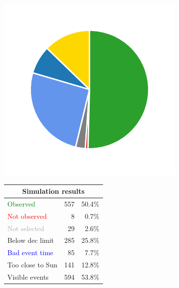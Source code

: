 \begin{colsection}
\begin{colsection}
\begin{figure}[p]
\begin{center}
    \begin{minipage}[t]{0.2\textwidth}\vspace{10pt}
    \includegraphics[width=\linewidth]{images/gw_sims/2n8_pie.png}
    \end{minipage}
    \begin{minipage}[t]{0.37\textwidth}\vspace{0pt}
    \begin{tabular}{lrr}
    \multicolumn{3}{c}{\textbf{Simulation results}} \\
    \midrule
    \textcolor{Green}{Observed} & 557 & 50.4\% \\
    \textcolor{Red}{Not observed} & 8 & 0.7\% \\
    \textcolor{darkgray}{Not selected} & 29 & 2.6\% \\
    \textcolor{NavyBlue}{Below dec limit} & 285 & 25.8\% \\
    \textcolor{Blue}{Bad event time} & 85 & 7.7\% \\
    \textcolor{BurntOrange}{Too close to Sun} & 141 & 12.8\% \\
    \midrule
    Visible events & 594 &  53.8\% \\
    \end{tabular}
    \end{minipage}

\end{center}
\end{figure}
\end{colsection}
\end{colsection}
